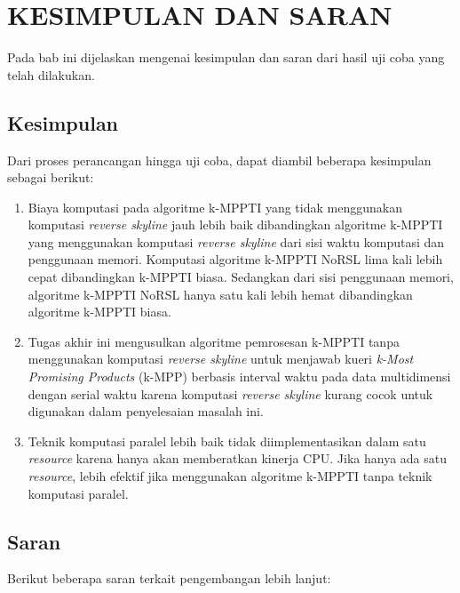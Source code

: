 \chapter{KESIMPULAN DAN SARAN}\label{chap:kesimpulan-saran}

\tab Pada bab ini dijelaskan mengenai kesimpulan dan saran dari hasil uji coba yang telah dilakukan.

\section{Kesimpulan}

\tab Dari proses perancangan hingga uji coba, dapat diambil beberapa kesimpulan sebagai berikut:

\begin{enumerate}
	\item Biaya komputasi pada algoritme k-MPPTI yang tidak menggunakan komputasi \textit{reverse skyline} jauh lebih baik dibandingkan algoritme k-MPPTI yang menggunakan komputasi \textit{reverse skyline} dari sisi waktu komputasi dan penggunaan memori. Komputasi algoritme k-MPPTI NoRSL lima kali lebih cepat dibandingkan k-MPPTI biasa. Sedangkan dari sisi penggunaan memori, algoritme k-MPPTI NoRSL hanya satu kali lebih hemat dibandingkan algoritme k-MPPTI biasa.
	
	\item  Tugas akhir ini mengusulkan algoritme pemrosesan k-MPPTI tanpa menggunakan komputasi \textit{reverse skyline} untuk menjawab kueri \textit{k-Most Promising Products} (k-MPP) berbasis interval waktu pada data multidimensi dengan serial waktu karena komputasi \textit{reverse skyline} kurang cocok untuk digunakan dalam penyelesaian masalah ini.
	
	\item Teknik komputasi paralel lebih baik tidak diimplementasikan dalam satu \textit{resource} karena hanya akan memberatkan kinerja CPU. Jika hanya ada satu \textit{resource}, lebih efektif jika menggunakan algoritme k-MPPTI tanpa teknik komputasi paralel.
	
	
\end{enumerate}

\section{Saran}

\tab Berikut beberapa saran terkait pengembangan lebih lanjut:

